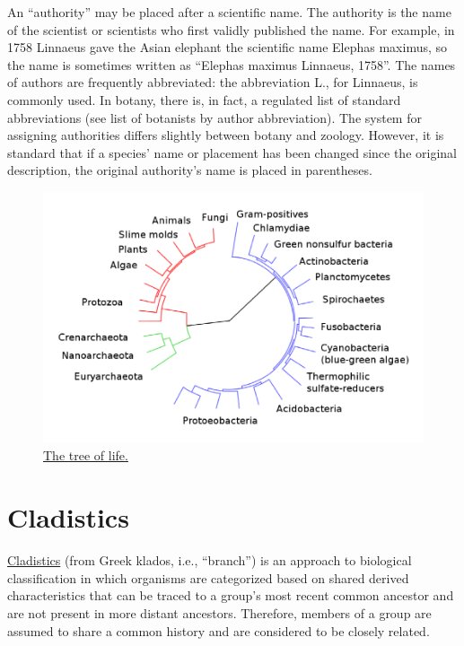 An ``authority'' may be placed after a scientific name. The authority is
the name of the scientist or scientists who first validly published the
name. For example, in 1758 Linnaeus gave the Asian elephant the
scientific name Elephas maximus, so the name is sometimes written as
``Elephas maximus Linnaeus, 1758''. The names of authors are frequently
abbreviated: the abbreviation L., for Linnaeus, is commonly used. In
botany, there is, in fact, a regulated list of standard abbreviations
(see list of botanists by author abbreviation). The system for assigning
authorities differs slightly between botany and zoology. However, it is
standard that if a species' name or placement has been changed since the
original description, the original authority's name is placed in
parentheses.

\begin{figure}

{\centering \includegraphics[width=0.7\linewidth]{./figures/appendix1/tree_of_life}

}

\caption{\href{https://commons.wikimedia.org/wiki/File:CollapsedtreeLabels-simplified.svg}{The
tree of life.}}\label{fig:tree}
\end{figure}

\section{Cladistics}\label{cladistics}

\href{https://en.wikipedia.org/wiki/Cladistics}{Cladistics} (from Greek
klados, i.e., ``branch'') is an approach to biological classification in
which organisms are categorized based on shared derived characteristics
that can be traced to a group's most recent common ancestor and are not
present in more distant ancestors. Therefore, members of a group are
assumed to share a common history and are considered to be closely
related.

